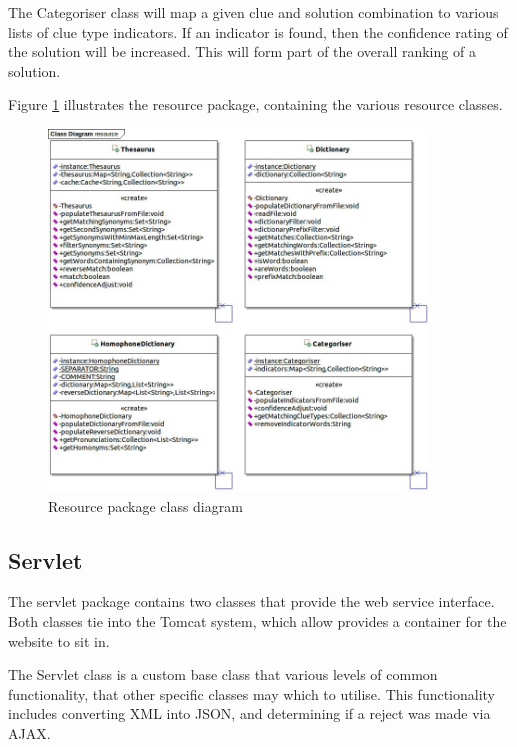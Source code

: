 The Categoriser class will map a given clue and solution combination to various 
lists of clue type indicators. If an indicator is found, then the confidence 
rating of the solution will be increased. This will form part of the overall 
ranking of a solution.

Figure \ref{fig:resource_package} illustrates the resource package, containing 
the various resource classes.

\begin{figure}[H]
  \centering
  \includegraphics[width=0.9\textwidth]{design/class/resource.jpg}
  \caption{Resource package class diagram}
  \label{fig:resource_package}
\end{figure}


\subsection{Servlet}
\label{sub:servlet}

The servlet package contains two classes that provide the web service interface.
Both classes tie into the Tomcat system, which allow provides a container for 
the website to sit in. 

The Servlet class is a custom base class that various levels of common 
functionality, that other specific classes may which to utilise. This 
functionality includes converting XML into JSON, and determining if a reject was
made via AJAX.

